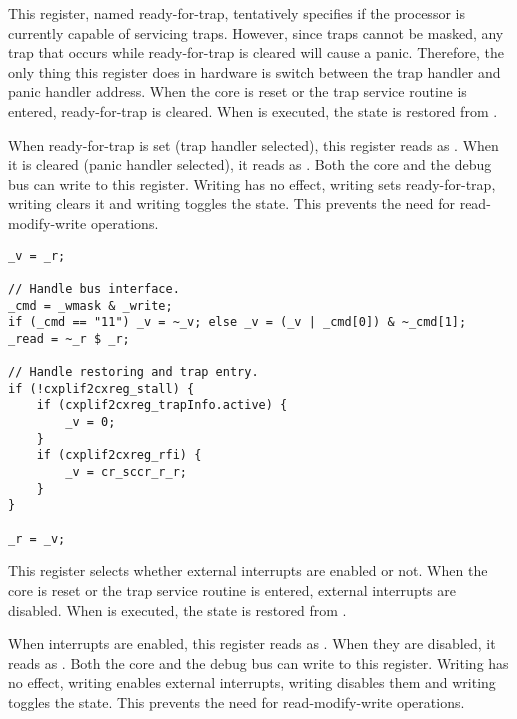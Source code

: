 This register, named ready-for-trap, tentatively specifies if the processor is
currently capable of servicing traps. However, since traps cannot be masked,
any trap that occurs while ready-for-trap is cleared will cause a panic.
Therefore, the only thing this register does in hardware is switch between the
trap handler and panic handler address. When the core is reset or the trap
service routine is entered, ready-for-trap is cleared. When  is 
executed, the state is restored from .

When ready-for-trap is set (trap handler selected), this register reads as 
. When it is cleared (panic handler selected), it reads as . 
Both the core and the debug bus can write to this register. Writing  
has no effect, writing  sets ready-for-trap, writing  clears 
it and writing  toggles the state. This prevents the need for 
read-modify-write operations.

\declaration{}
\implementation{}
\begin{lstlisting}
_v = _r;

// Handle bus interface.
_cmd = _wmask & _write;
if (_cmd == "11") _v = ~_v; else _v = (_v | _cmd[0]) & ~_cmd[1];
_read = ~_r $ _r;

// Handle restoring and trap entry.
if (!cxplif2cxreg_stall) {
    if (cxplif2cxreg_trapInfo.active) {
        _v = 0;
    }
    if (cxplif2cxreg_rfi) {
        _v = cr_sccr_r_r;
    }
}

_r = _v;
\end{lstlisting}

This register selects whether external interrupts are enabled or not. When the 
core is reset or the trap service routine is entered, external interrupts are 
disabled. When  is executed, the state is restored from .

When interrupts are enabled, this register reads as . When they are 
disabled, it reads as . Both the core and the debug bus can write to 
this register. Writing  has no effect, writing  enables 
external interrupts, writing  disables them and writing  
toggles the state. This prevents the need for read-modify-write operations.

